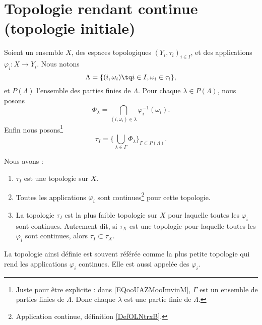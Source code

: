 \section{Topologie rendant continue (topologie initiale)}

\begin{propositionDef}     \label{PROPooGOEVooZBAOQh}
	Soient un ensemble \( X\), des espaces topologiques \( (Y_i,\tau_i)_{i\in I}\), et des applications \( \varphi_i\colon X\to Y_i\). Nous notons
	\begin{equation}
		\Lambda=\{ (i,\omega_i)\tq i\in I, \omega_i\in \tau_i \},
	\end{equation}
	et \( P(\Lambda)\) l'ensemble des parties finies de \( \Lambda\). Pour chaque \( \lambda\in P(\Lambda)\), nous posons
	\begin{equation}
		\Phi_{\lambda}=\bigcap_{(i,\omega_i)\in \lambda}\varphi_i^{-1}(\omega_i).
	\end{equation}
	Enfin nous posons\footnote{ Juste pour être explicite : dans \eqref{EQooUAZMooImvinM}, \( \Gamma\) est un ensemble de parties finies de \( \Lambda\). Donc chaque \( \lambda\) est une partie finie de \( \Lambda\). }
	\begin{equation}		\label{EQooUAZMooImvinM}
		\tau_I=\Big\{   \bigcup_{\lambda\in \Gamma}\Phi_{\lambda}  \Big\}_{\Gamma\subset P(\Lambda)}.
	\end{equation}


	Nous avons :
	\begin{enumerate}
		\item
		      \( \tau_I\) est une topologie sur \( X\).
		\item
		      Toutes les applications \( \varphi_i\) sont continues\footnote{Application continue, définition \ref{DefOLNtrxB}.} pour cette topologie.
		\item		\label{ITEMooJLXPooMokQuP}
		      La topologie \( \tau_I\) est la plus faible topologie sur \( X\) pour laquelle toutes les \( \varphi_i\) sont continues. Autrement dit, si \( \tau_X\) est une topologie pour laquelle toutes les \( \varphi_i\) sont continues, alors \( \tau_I\subset\tau_X\).
	\end{enumerate}

	La topologie ainsi définie est souvent référée comme la plus petite topologie qui rend les applications \( \varphi_i\) continues. Elle est aussi appelée  des \( \varphi_i\).
\end{propositionDef}


